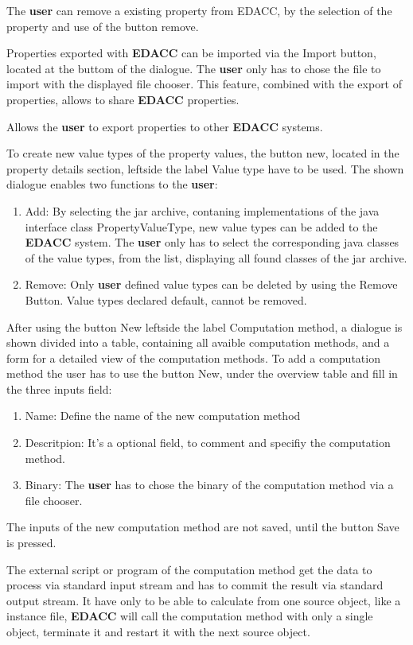 The \textbf{user} can remove a existing property from EDACC, by the selection of the property and use of the button remove.

Properties exported with \textbf{EDACC} can be imported via the Import button, located at the buttom of the dialogue. The \textbf{user} only has to chose the file to import with the displayed file chooser. This feature, combined with the export of properties,  allows to share \textbf{EDACC} properties.

Allows the \textbf{user} to export properties to other \textbf{EDACC} systems.

To create new value types of the property values, the button new, located in the property details section, leftside the label Value type have to be used. The shown dialogue enables two functions to the \textbf{user}:
\begin{enumerate}
	\item Add: By selecting the jar archive, contaning implementations of the java interface class PropertyValueType, new value types can be added to the \textbf{EDACC} system. The \textbf{user} only has to select the corresponding java classes of the value types, from the list, displaying all found classes of the jar archive.
	\item Remove: Only \textbf{user} defined value types can be deleted by using the Remove Button. Value types declared default, cannot be removed.
\end{enumerate}

After using the button New leftside the label Computation method, a dialogue is shown divided into a table, containing all avaible computation methods, and a form for a detailed view of the computation methods. To add a computation method the user has to use the button New, under the overview table and fill in the three inputs field:
\begin{enumerate}
	\item Name: Define the name of the new computation method
	\item Descritpion: It's a optional field, to comment and specifiy the computation method.
	\item Binary: The \textbf{user} has to chose the binary of the computation method via a file chooser.
\end{enumerate}
\attention The inputs of the new computation method are not saved, until the button Save is pressed. 

\attention The external script or program of the computation method get the data to process via standard input stream and has to commit the result via standard output stream. It have only to be able to calculate from one source object, like a instance file, \textbf{EDACC} will call the computation method with only a single object, terminate it and restart it with the next source object.